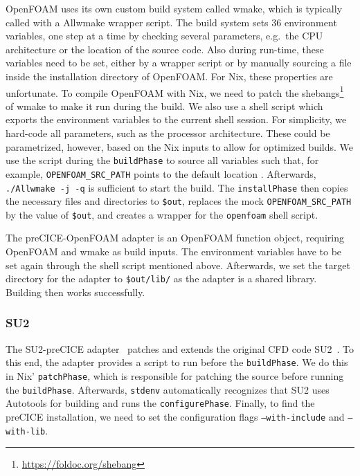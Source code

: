 \documentclass{eceasst}
\begin{document}
OpenFOAM uses its own custom build system called wmake, which is typically called with a Allwmake wrapper script.
The build system sets 36 environment variables, one step at a time by checking several parameters, e.g.~the CPU architecture or the location of the source code. Also during run-time, these variables need to be set, either by a wrapper script or by manually sourcing a file inside the installation directory of OpenFOAM.
For Nix, these properties are unfortunate. To compile OpenFOAM with Nix, we need to patch the shebangs\footnote{\url{https://foldoc.org/shebang}} of wmake to make it run during the build.
We also use a shell script which exports the environment variables to the current shell session.
For simplicity, we hard-code all parameters, such as the processor architecture. These could be parametrized, however, based on the Nix inputs to allow for optimized builds. We use the script during the \texttt{buildPhase} to source all variables such that, for example, \texttt{OPENFOAM\_SRC\_PATH} points to the default location .
Afterwards, \texttt{./Allwmake -j -q} is sufficient to start the build.
The \texttt{installPhase} then copies the necessary files and directories to \texttt{\$out}, replaces the mock \texttt{OPENFOAM\_SRC\_PATH} by the value of \texttt{\$out}, and creates a wrapper for the \texttt{openfoam} shell script.

The preCICE-OpenFOAM adapter is an OpenFOAM function object, requiring OpenFOAM and wmake as build inputs.
The environment variables have to be set again through the shell script mentioned above.
Afterwards, we set the target directory for the adapter to \texttt{\$out/lib/} as the adapter is a shared library. Building then works successfully.

\subsubsection{SU2}

The SU2-preCICE adapter~\cite{Uekermann2017_Adapters} patches and extends the original CFD code SU2~\cite{su2}.
To this end, the adapter provides a script to run before the \texttt{buildPhase}.
We do this in Nix' \texttt{patchPhase}, which is responsible for patching the source before running the \texttt{buildPhase}. Afterwards, \texttt{stdenv} automatically recognizes that SU2 uses Autotools for building and runs the \texttt{configurePhase}.
Finally, to find the preCICE installation, we need to set the configuration flags \texttt{--with-include} and \texttt{--with-lib}.
\end{document}
